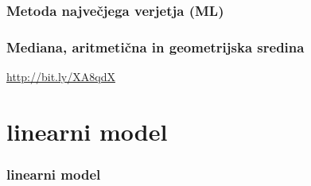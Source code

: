 \begin{frame}[fragile]
\frametitle{Metoda največjega verjetja (ML)}
\begin{center}
 \vspace{0pt} 
\end{center}
\end{frame}

\begin{frame}[fragile]
\frametitle{Mediana, aritmetična  in geometrijska sredina}
\url{http://bit.ly/XA8qdX}
\end{frame}


\section{linearni model}
\begin{frame}[fragile]
\frametitle{linearni model}

\end{frame}





